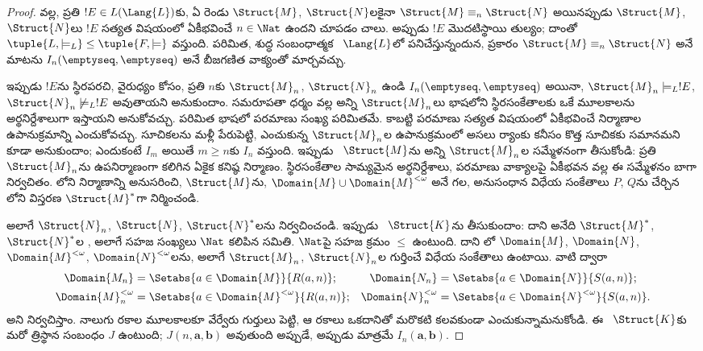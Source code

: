 \documentclass[../../../include/open-logic-section]{subfiles}
\begin{document}
\begin{proof}
 వల్ల, ప్రతి $!E\in L(\Lang{L})$కు, ఏ రెండు
 $\Struct{M}$, $\Struct{N}$లకైనా
  $\Struct{M}\equiv_n\Struct{N}$ అయినప్పుడు $\Struct{M}$, $\Struct{N}$లు
  $!E$ సత్యత విషయంలో ఏకీభవించే
$n\in\Nat$ ఉందని చూపడం చాలు. అప్పుడు $!E$ మొదటిస్థాయి
 తుల్యం; దాంతో
$\tuple{L,\models_L}\le\tuple{F,\models}$ వస్తుంది. పరిమిత, శుద్ధ
సంబంధాత్మక ~$\Lang{L}$లో పనిచేస్తున్నందున,
 ప్రకారం
$\Struct{M}\equiv_n\Struct{N}$ అనే మాటను
$I_n(\emptyseq,\emptyseq)$ అనే బీజగణిత వాక్యంతో మార్చవచ్చు.

ఇప్పుడు $!E$ను స్థిరపరచి, వైరుధ్యం కోసం, ప్రతి $n$కు
 $\Struct{M}_n$,
$\Struct{N}_n$ ఉండి $I_n(\emptyseq,\emptyseq)$ అయినా,
$\Struct{M}_n\models_L!E$, $\Struct{N}_n\not\models_L!E$ అవుతాయని
అనుకుందాం. సమరూపతా ధర్మం వల్ల అన్ని $\Struct{M}_n$లు భాషలోని
స్థిరసంకేతాలకు ఒకే మూలకాలను అర్థనిర్దేశాలుగా ఇస్తాయని అనుకోవచ్చు.
పరిమిత భాషలో పరమాణు  సంఖ్య
పరిమితమే. కాబట్టి పరమాణు  సత్యత
విషయంలో ఏకీభవించే నిర్మాణాల ఉపానుక్రమాన్ని ఎంచుకోవచ్చు. సూచికలను మళ్లీ
పేరుపెట్టి, ఎంచుకున్న $\Struct{M}_n$ల ఉపానుక్రమంలో
అసలు ర్యాంకు కనీసం కొత్త సూచికకు
సమానమని కూడా అనుకుందాం; ఎందుకంటే $I_m$ అయితే $m\ge n$కు $I_n$
వస్తుంది. ఇప్పుడు ~$\Struct{M}$ను
అన్ని $\Struct{M}_n$ల సమ్మేళనంగా తీసుకోండి: ప్రతి $\Struct{M}_n$ను
ఉపనిర్మాణంగా కలిగిన ఏకైక కనిష్ఠ నిర్మాణం. స్థిరసంకేతాల సామ్యమైన
అర్థనిర్దేశాలు, పరమాణు వాక్యాలపై ఏకీభవన వల్ల ఈ సమ్మేళనం బాగా
నిర్వచితం. %
%
%
%
%
%
%
%
లోని నిర్మాణాన్ని అనుసరించి,
$\Struct{M}$ను, $\Domain{M}\cup\Domain{M}^{<\omega}$ అనే
 గల, అనుసంధాన
విధేయ సంకేతాలు $P$, $Q$ను చేర్చిన
లోని విస్తరణ $\Struct{M}^*$గా
నిర్మించండి.

అలాగే $\Struct{N}_n$, $\Struct{N}$, $\Struct{N}^*$లను నిర్వచించండి.
ఇప్పుడు ~$\Struct{K}$ను తీసుకుందాం:
దాని  అనేది $\Struct{M}^*$,
$\Struct{N}^*$ల , అలాగే
సహజ సంఖ్యలు $\Nat$ కలిపిన సమితి. $\Nat$పై సహజ క్రమం $\le$ ఉంటుంది. దాని
లో $\Domain{M}$, $\Domain{N}$,
$\Domain{M}^{<\omega}$, $\Domain{N}^{<\omega}$లను, అలాగే
$\Struct{M}_n$, $\Struct{N}_n$ల
 గుర్తించే విధేయ సంకేతాలు ఉంటాయి. వాటి ద్వారా
\begin{align*}
  \Domain{M_n} & = \Setabs{a \in \Domain{M}}{R(a,n)}; &
  \Domain{N_n} & = \Setabs{a \in \Domain{N}}{S(a,n)}; \\
  \Domain{M}^{<\omega}_n & = \Setabs{a \in \Domain{M}^{<\omega}}{R(a,n)}; &
  \Domain{N}^{<\omega}_n & = \Setabs{a \in \Domain{N}^{<\omega}}{S(a,n)}.
\end{align*}
అని నిర్వచిస్తాం. నాలుగు రకాల మూలకాలకూ వేర్వేరు గుర్తులు పెట్టి,
ఆ రకాలు ఒకదానితో మరొకటి కలవకుండా ఎంచుకున్నామనుకోండి.
ఈ ~$\Struct{K}$కు మరో
త్రిస్థాన సంబంధం $J$ ఉంటుంది; $J(n,\mathbf{a},\mathbf{b})$ అవుతుంది
అప్పుడే, అప్పుడు మాత్రమే $I_n(\mathbf{a},\mathbf{b})$.


\end{proof}
\end{document}
